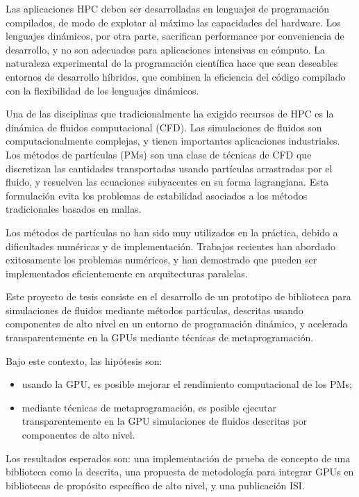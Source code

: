 \documentclass[11pt,spanish]{article}
\begin{document}
Las aplicaciones HPC deben ser desarrolladas en lenguajes de programación
compilados, de modo de explotar al máximo las capacidades del hardware.  Los
lenguajes dinámicos, por otra parte, sacrifican performance por conveniencia de
desarrollo, y no son adecuados para aplicaciones intensivas en cómputo.  La
naturaleza experimental de la programación científica hace que sean deseables
entornos de desarrollo híbridos, que combinen la eficiencia del código compilado
con la flexibilidad de los lenguajes dinámicos.

Una de las disciplinas que tradicionalmente ha exigido recursos de HPC es la
dinámica de fluidos computacional (CFD).  Las simulaciones de fluidos son
computacionalmente complejas, y tienen importantes aplicaciones industriales.
Los métodos de partículas (PMs) son una clase de técnicas de CFD que
discretizan las cantidades transportadas usando partículas arrastradas por el
fluido, y resuelven las ecuaciones subyacentes en su forma lagrangiana.
Esta formulación evita los problemas de estabilidad asociados a los métodos
tradicionales basados en mallas.

Los métodos de partículas no han sido muy utilizados en la práctica, debido a
dificultades numéricas y de implementación. Trabajos recientes han abordado
exitosamente los problemas numéricos, y han demostrado que pueden ser
implementados eficientemente en arquitecturas paralelas.

Este proyecto de tesis consiste en el desarrollo de un prototipo de biblioteca
para simulaciones de fluidos mediante métodos partículas, descritas usando
componentes de alto nivel en un entorno de programación dinámico, y acelerada
transparentemente en la GPUs mediante técnicas de metaprogramación.

Bajo este contexto, las hipótesis son:
\begin{itemize}
    \item usando la GPU, es posible mejorar el rendimiento computacional de los PMs;
    \item mediante técnicas de metaprogramación, es posible ejecutar
        transparentemente en la GPU simulaciones de fluidos descritas por
        componentes de alto nivel.
\end{itemize}

Los resultados esperados son:  una implementación de prueba de concepto de una
biblioteca  como la descrita, una propuesta de metodología para integrar GPUs
en bibliotecas de propósito específico de alto nivel, y una publicación ISI.
\end{document}
